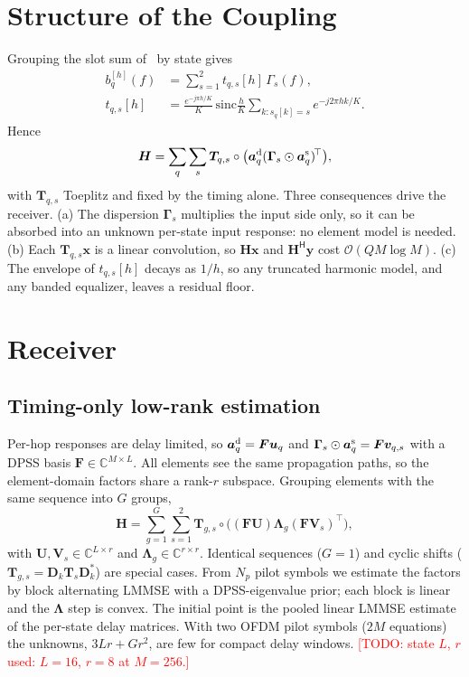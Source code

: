 \documentclass[journal]{IEEEtran}
\newcommand{\TODO}[1]{\textcolor{red}{[TODO: #1]}}
\begin{document}
\section{Structure of the Coupling}
Grouping the slot sum of~\cite[eq.~(5)]{iudice2026} by state gives
\begin{align}
b_q^{[h]}(f)&=\sum_{s=1}^{2} t_{q,s}[h]\,\Gamma_s(f),\\
t_{q,s}[h]&=\frac{e^{-j\pi h/K}}{K}\,\mathrm{sinc}\frac{h}{K}\!\!\sum_{k:s_q[k]=s}\!\!e^{-j2\pi hk/K}.
\end{align}
Hence
\begin{equation}
\bm H=\sum_{q}\sum_{s}\bm T_{q,s}\circ\big(\bm a^{\rm d}_q(\bm\Gamma_s\odot\bm a^{\rm s}_q)^{\!\top}\big),
\label{eq:struct}
\end{equation}
with $\bm T_{q,s}$ Toeplitz and fixed by the timing alone. Three consequences
drive the receiver. (a) The dispersion $\bm\Gamma_s$ multiplies the input side only,
so it can be absorbed into an unknown per-state input response: no element model
is needed. (b) Each $\bm T_{q,s}\bm x$ is a linear convolution, so $\bm H\bm x$ and
$\bm H^{\mathsf H}\bm y$ cost $\mathcal O(QM\log M)$. (c) The envelope of $t_{q,s}[h]$
decays as $1/h$, so any truncated harmonic model, and any banded equalizer,
leaves a residual floor.

\section{Receiver}
\subsection{Timing-only low-rank estimation}
Per-hop responses are delay limited, so $\bm a^{\rm d}_q=\bm F\bm u_q$ and
$\bm\Gamma_s\odot\bm a^{\rm s}_q=\bm F\bm v_{q,s}$ with a DPSS basis
$\bm F\in\mathbb C^{M\times L}$. All elements see the same propagation paths, so the
element-domain factors share a rank-$r$ subspace. Grouping elements with the same
sequence into $G$ groups,
\begin{equation}
\bm H=\sum_{g=1}^{G}\sum_{s=1}^{2}\bm T_{g,s}\circ\big((\bm F\bm U)\bm\Lambda_g(\bm F\bm V_s)^{\!\top}\big),
\label{eq:model}
\end{equation}
with $\bm U,\bm V_s\in\mathbb C^{L\times r}$ and $\bm\Lambda_g\in\mathbb C^{r\times r}$.
Identical sequences ($G=1$) and cyclic shifts ($\bm T_{g,s}=\bm D_k\bm T_s\bm D_k^*$)
are special cases. From $N_p$ pilot symbols we estimate the factors by block
alternating LMMSE with a DPSS-eigenvalue prior; each block is linear and the
$\bm\Lambda$ step is convex. The initial point is the pooled linear LMMSE
estimate of the per-state delay matrices. With two OFDM pilot symbols
($2M$ equations) the unknowns, $3Lr+Gr^2$, are few for compact delay windows.
\TODO{state $L$, $r$ used: $L=16$, $r=8$ at $M=256$.}
\end{document}
